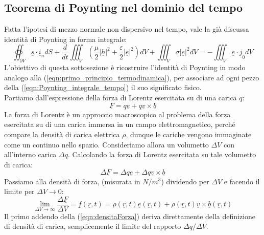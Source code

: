 \documentclass{book}
\begin{document}
    \subsection{Teorema di Poynting nel dominio del tempo}
        Fatta l'ipotesi di mezzo normale non dispersivo nel tempo, vale la già discussa identità di Poynting in forma integrale:
        \begin{equation}
            \label{eqn:Poynting_integrale_tempo}
            \oiint_{\partial V} \underline{s} \cdot \underline{i}_{n}dS+\frac{d}{dt}\iiint_{V}(\frac{\mu}{2}|\underline{h}|^{2}+\frac{\varepsilon}{2}|\underline{e}|^{2})dV +
            \iiint_{V}\sigma |\underline{e}|^{2}dV = - \iiint_{V} \underline{e}\cdot \underline{j}_{0}dV
        \end{equation}
        L'obiettivo di questa sottosezione è ricostruire l'identità di Poynting in modo analogo alla (\ref{eqn:primo_principio_termodinamica}), per associare ad ogni pezzo della
        (\ref{eqn:Poynting_integrale_tempo}) il suo significato fisico. \\
        Partiamo dall'espressione della forza di Lorentz esercitata su di una carica $q$:
        \begin{equation}
            \underline{F}= q \underline{e}+q \underline{v} \times \underline{b}
        \end{equation}
        La forza di Lorentz è un approccio macroscopico al problema della forza esercitata su di una carica immersa in un campo elettromagnetico, perché compare la densità di carica
        elettrica $\rho$, dunque le cariche vengono immaginate come un continuo nello spazio. Consideriamo allora un volumetto $\Delta V$ con all'interno carica $\Delta q$.
        Calcolando la forza di Lorentz esercitata su tale volumetto di carica:
        \begin{equation}
            \Delta \underline{F} = \Delta q\underline{e}+\Delta q \underline{v}\times \underline{b}
        \end{equation}
        Passiamo alla densità di forza, (misurata in $N/m^{3}$) dividendo per $\Delta V$ e facendo il limite per $\Delta V \to 0$:
        \begin{equation}
            \label{eqn:densitaForza}
            \lim_{\Delta V \to \infty} \frac{\Delta \underline{F}}{\Delta V} = \underline{f}(\underline{r},t) = \rho(\underline{r},t)\underline{e}(\underline{r},t)+\rho(\underline{r},t)\underline{v}\times \underline{b}(\underline{r},t)
        \end{equation}
        Il primo addendo della (\ref{eqn:densitaForza}) deriva direttamente della definizione di densità di carica, semplicemente il limite del rapporto $\Delta q/\Delta V$.
\end{document}
